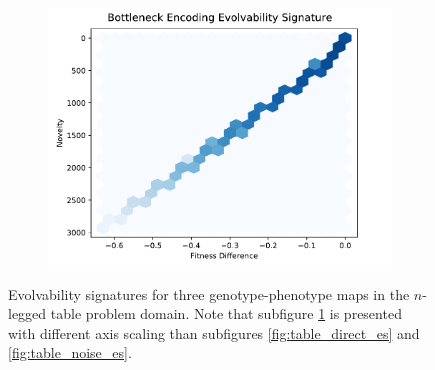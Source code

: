\begin{figure}
\begin{subfigure}[b]{0.33\linewidth}
    \includegraphics[width=\linewidth]{img/results/bottleneck_es_unscaled}
    \label{fig:table_bottleneck_es}
  \end{subfigure}
  \caption{
    Evolvability signatures for three genotype-phenotype maps in the $n$-legged table problem domain.
    Note that subfigure \ref{fig:table_bottleneck_es} is presented with different axis scaling than subfigures \ref{fig:table_direct_es} and \ref{fig:table_noise_es}.
  }\label{fig:all_es}
\end{figure}
